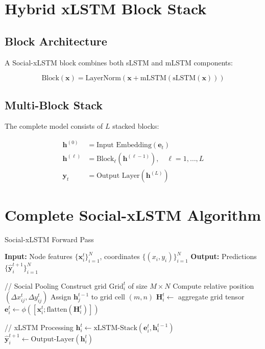 \documentclass[11pt,a4paper]{article}
\begin{document}
\section{Hybrid xLSTM Block Stack}

\subsection{Block Architecture}

A Social-xLSTM block combines both sLSTM and mLSTM components:

\begin{equation}
\text{Block}(\mathbf{x}) = \text{LayerNorm}(\mathbf{x} + \text{mLSTM}(\text{sLSTM}(\mathbf{x})))
\end{equation}

\subsection{Multi-Block Stack}

The complete model consists of $L$ stacked blocks:

\begin{align}
\mathbf{h}^{(0)} &= \text{Input Embedding}(\mathbf{e}_t) \\
\mathbf{h}^{(\ell)} &= \text{Block}_\ell(\mathbf{h}^{(\ell-1)}), \quad \ell = 1, \ldots, L \\
\mathbf{y}_t &= \text{Output Layer}(\mathbf{h}^{(L)})
\end{align}

\section{Complete Social-xLSTM Algorithm}

\begin{algorithm}
\caption{Social-xLSTM Forward Pass}
\begin{algorithmic}
\STATE \textbf{Input:} Node features $\{\mathbf{x}_i^t\}_{i=1}^N$, coordinates $\{(x_i, y_i)\}_{i=1}^N$
\STATE \textbf{Output:} Predictions $\{\hat{\mathbf{y}}_i^{t+1}\}_{i=1}^N$

    \STATE // Social Pooling
    \STATE Construct grid $\text{Grid}_i^t$ of size $M \times N$
        \STATE Compute relative position $(\Delta x_{ij}^t, \Delta y_{ij}^t)$
        \STATE Assign $\mathbf{h}_j^{t-1}$ to grid cell $(m, n)$
    \ENDFOR
    \STATE $\mathbf{H}_i^t \leftarrow$ aggregate grid tensor
    \STATE $\mathbf{e}_i^t \leftarrow \phi([\mathbf{x}_i^t; \text{flatten}(\mathbf{H}_i^t)])$
    
    \STATE // xLSTM Processing
    \STATE $\mathbf{h}_i^t \leftarrow \text{xLSTM-Stack}(\mathbf{e}_i^t, \mathbf{h}_i^{t-1})$
    \STATE $\hat{\mathbf{y}}_i^{t+1} \leftarrow \text{Output-Layer}(\mathbf{h}_i^t)$
\ENDFOR
\end{algorithmic}
\end{algorithm}
\end{document}
